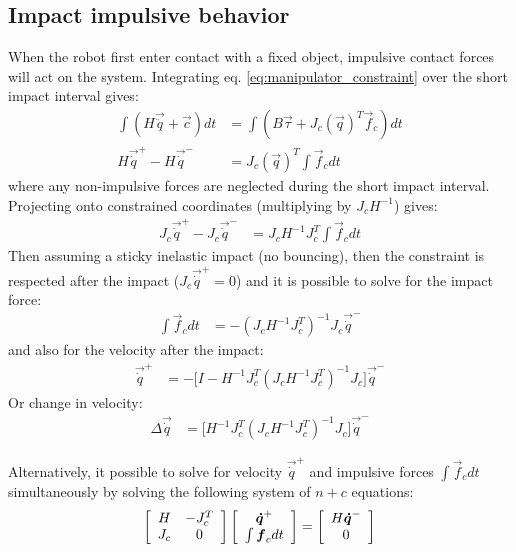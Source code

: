 \subsection{Impact impulsive behavior}
\label{sec:impact}
%
When the robot first enter contact with a fixed object, impulsive contact forces will act on the system. Integrating eq. \eqref{eq:manipulator_constraint} over the short impact interval gives:
%
\begin{align}
\int{ ( H \vec{\ddot{q}} + \vec{c} ) dt } &= \int{ ( B \vec{\tau} + J_c( \vec{ q } )^T  \vec{f}_c ) dt } \\
H \vec{\dot{q}}^+ - H \vec{\dot{q}}^- &= J_c( \vec{ q } )^T  \int{  \vec{f}_c dt }
\label{eq:manipulator_impact}
\end{align}
%
where any non-impulsive forces are neglected during the short impact interval. Projecting onto constrained coordinates (multiplying by $J_c H^{-1}$) gives:
%
\begin{align}
J_c \vec{\dot{q}}^+ - J_c \vec{\dot{q}}^- &= J_c H^{-1} J_c^T  \int{  \vec{f}_c dt }
\label{eq:manipulator_impact2}
\end{align}
%
Then assuming a sticky inelastic impact (no bouncing), then the constraint is respected after the impact ($J_c \vec{\dot{q}}^+=0$) and it is possible to solve for the impact force:
%
\begin{align}
\int{  \vec{f}_c dt } &= - \left( J_c H^{-1} J_c^T \right)^{-1}  J_c \vec{\dot{q}}^-
\label{eq:manipulator_impact_force}
\end{align}
%
and also for the velocity after the impact:
%
\begin{align}
\vec{\dot{q}}^+ &= - \Big[ I - H^{-1} J_c^T \left( J_c H^{-1} J_c^T \right)^{-1} J_c \Big] \vec{\dot{q}}^-
\label{eq:manipulator_impact_velocity}
\end{align}
%
Or change in velocity:
%
\begin{align}
\Delta \vec{\dot{q}} &=  \Big[ H^{-1} J_c^T \left( J_c H^{-1} J_c^T \right)^{-1} J_c \Big] \vec{\dot{q}}^-
\label{eq:manipulator_impact_velocity_delta}
\end{align}
%

Alternatively, it possible to solve for velocity $\vec{\dot{q}}^+$ and impulsive forces $\int{ \vec{f}_c dt }$ simultaneously by solving the following system of $n+c$ equations:
%
\begin{align}
\left[ \begin{array}{c c } 	H & -J_c^T  \\ J_c 	& 0  	\end{array} \right] \left[ \begin{array}{c} \vec{\dot{q}}^+  \\ \int{ \vec{f}_c dt }\end{array} \right] = \left[ \begin{array}{c}  	H \vec{\dot{q}}^-   \\ 0  \end{array} \right]
\label{eq:manipulator_impact_eom}
\end{align}


